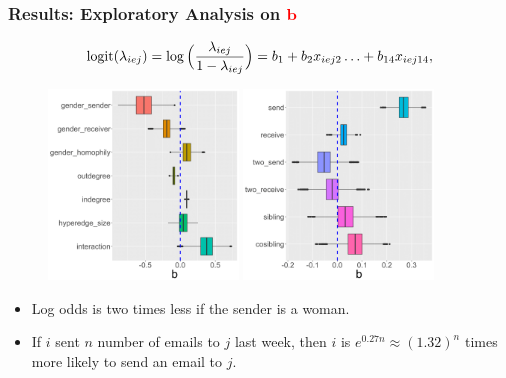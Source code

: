 \documentclass{beamer}
\begin{document}
		\begin{frame}
			\frametitle{Results: Exploratory Analysis on \textcolor{red}{$\boldsymbol{b}$}}
					\begin{equation*}
	\mbox{logit}(\lambda_{iej})=\log\Big(\frac{\lambda_{iej}}{1-\lambda_{iej}}\Big) =b_{1}+b_{2} x_{iej2}\ldots+b_{14}x_{iej14},\normalsize
					\end{equation*}
						\begin{figure}[!t]
						\centering
								\includegraphics[width=0.45\textwidth]{betanewplot2-1.png}
								\includegraphics[width=0.45\textwidth]{betanewplot3-1.png}
					\end{figure}
					\begin{itemize}
						\item Log odds is two times less if the sender is a woman.\vspace{0.15cm}
						\item If $i$ sent $n$ number of emails to $j$ last week, then $i$ is $e^{0.27n} \approx (1.32)^n$ times more likely to send an email to $j$.
					
					\end{itemize}				
		\end{frame}	
		
\end{document}
